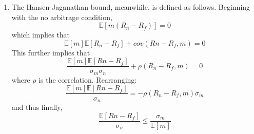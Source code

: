 \documentclass[11pt]{article}
\newcommand{\ev}{\mathbb{E}}
\begin{document}
\begin{enumerate}
\begin{enumerate}
			\item The Hansen-Jaganathan bound, meanwhile, is defined as follows. Beginning with the no arbitrage condition,
			\[\ev[m(R_n - R_f)] = 0\]
			which implies that
			\[\ev[m]\ev[R_n - R_f] + cov(Rn - R_f, m) = 0\]
			This further implies that
			\[\frac{\ev[m]\ev[Rn - R_f]}{\sigma_m \sigma_n} + \rho(R_n - R_f, m) = 0\]
			where $ \rho $ is the correlation. Rearranging:
			\[\frac{\ev[m]\ev[Rn - R_f]}{\sigma_n} = -\rho(R_n - R_f, m)\sigma_m\]
			and thus finally,
			\[\frac{\ev[Rn - R_f]}{\sigma_n} \leq \frac{\sigma_m}{\ev[m]}\]
		\end{enumerate} 
		
\end{enumerate}



\end{document}
